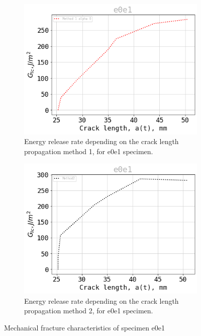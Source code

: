 \documentclass[3p,times,procedia]{elsarticle}
\begin{document}
\begin{figure}[htbp]
\begin{subfigure}[b]{0.4\textwidth}
		\includegraphics[width=\textwidth]{Figures/Gmet1_e0e1}
		\caption{Energy release rate depending on the crack length propagation method 1, for e0e1 specimen.}
		\label{fig:image3}
	\end{subfigure}
	\hfill
	\begin{subfigure}[b]{0.4\textwidth}
		\centering
		\includegraphics[width=\textwidth]{Figures/Gmet2_e0e1}
		\caption{Energy release rate depending on the crack length propagation method 2, for e0e1 specimen.}
		\label{fig:image4}
	\end{subfigure}
	\caption{Mechanical fracture characteristics of specimen e0e1}
	\label{fig:images}
\end{figure}
\end{document}
